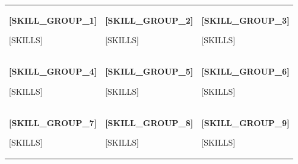 \documentclass[11pt, a4paper]{\tpl/awesome-cv}
\begin{document}
\vspace{-4mm}


\begin{tabularx}{\textwidth}{@{}X X X@{}}

\begin{minipage}[t]{\linewidth}
\textbf{[SKILL_GROUP_1]}

[SKILLS]
\end{minipage}

&

\begin{minipage}[t]{\linewidth}
\textbf{[SKILL_GROUP_2]}

[SKILLS]
\end{minipage}

&

\begin{minipage}[t]{\linewidth}
\textbf{[SKILL_GROUP_3]}

[SKILLS]
\end{minipage}

\\[10mm]

\begin{minipage}[t]{\linewidth}
\textbf{[SKILL_GROUP_4]}

[SKILLS]
\end{minipage}

&

\begin{minipage}[t]{\linewidth}
\textbf{[SKILL_GROUP_5]}

[SKILLS]
\end{minipage}

&

\begin{minipage}[t]{\linewidth}
\textbf{[SKILL_GROUP_6]}

[SKILLS]
\end{minipage}

\\[10mm]

\begin{minipage}[t]{\linewidth}
\textbf{[SKILL_GROUP_7]}

[SKILLS]
\end{minipage}

&

\begin{minipage}[t]{\linewidth}
\textbf{[SKILL_GROUP_8]}

[SKILLS]
\end{minipage}

&

\begin{minipage}[t]{\linewidth}
\textbf{[SKILL_GROUP_9]}

[SKILLS]
\end{minipage}

\end{tabularx}
\end{document}
